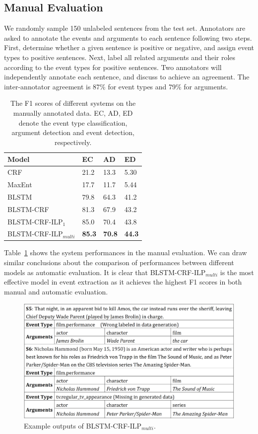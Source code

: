 \subsection{Manual Evaluation \label{manualeve}}
We randomly sample 150 unlabeled sentences from the test set. Annotators are asked to annotate the events and arguments to each sentence following two steps. First, determine whether a given sentence is positive or negative, and assign event types to positive sentences. Next, label all related arguments and their roles according to the event types for positive sentences. Two annotators will independently annotate each sentence, and discuss to achieve an agreement. The inter-annotator agreement is 87\% for event types and 79\% for arguments.

\begin{table}[h]
\small
\centering
\begin{tabular}{|l|p{0.8cm}<{\centering}|p{0.8cm}<{\centering}|p{0.8cm}<{\centering}|} \hline
	Model & EC & AD & ED \\ \hline
	CRF & 21.2 & 13.3 & 5.30 \\ \hline
	MaxEnt & 17.7 & 11.7 & 5.44 \\ \hline
	BLSTM & 79.8 & 64.3 & 41.2 \\ \hline \hline
	BLSTM-CRF & 81.3 & 67.9 & 43.2 \\ \hline
	BLSTM-CRF-ILP$_{1}$ & 85.0 & 70.4 & 43.8 \\ \hline
	BLSTM-CRF-ILP$_{multi}$ & \textbf{85.3} & \textbf{70.8} & \textbf{44.3} \\ \hline
\end{tabular}
\caption{ The F1 scores of different systems on the manually annotated data. EC, AD, ED denote the event type classification, argument detection and event detection, respectively. \label{tab:2}}
\end{table}

Table~\ref{tab:2} shows the system performances in the manual evaluation. We can draw similar conclusions about the comparison of performances between different models as automatic evaluation. It is clear that BLSTM-CRF-ILP$_{multi}$ is the most effective model in event extraction as it achieves the highest F1 scores in both manual and automatic evaluation.

\begin{figure}[h]
	\centering
	\includegraphics[width=.48\textwidth]{temp_figure3.png}
	\caption{Example outputs of BLSTM-CRF-ILP$_{multi}$.\label{fig:1}}
\end{figure}

